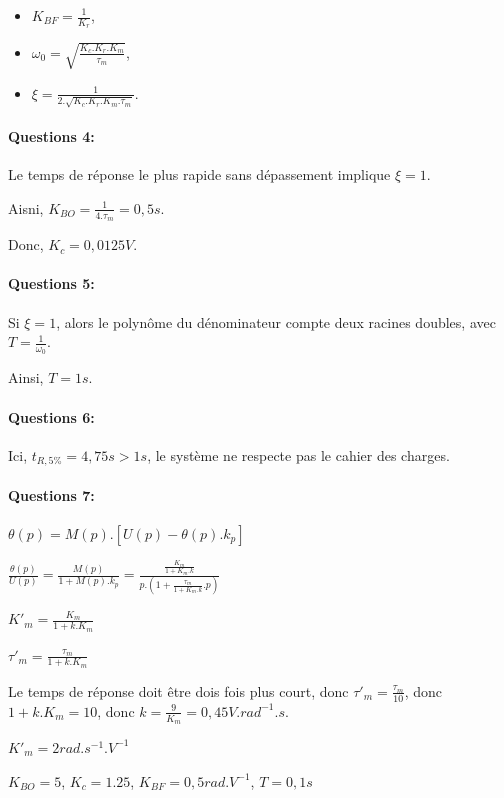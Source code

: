 \begin{itemize}
 \item $K_{BF}=\frac{1}{K_r}$,
 \item $\omega_0=\sqrt{\frac{K_c.K_r.K_m}{\tau_m}}$,
 \item $\xi=\frac{1}{2.\sqrt{K_c.K_r.K_m.\tau_m}}$.
\end{itemize}

\paragraph{Questions 4:}

Le temps de réponse le plus rapide sans dépassement implique $\xi=1$.

Aisni, $K_{BO}=\frac{1}{4.\tau_m}=0,5s$.

Donc, $K_c=0,0125V$.

\paragraph{Questions 5:}

Si $\xi=1$, alors le polynôme du dénominateur compte deux racines doubles, avec  $T=\frac{1}{\omega_0}$.

Ainsi, $T=1s$.

\paragraph{Questions 6:}

Ici, $t_{R,5\%}=4,75s>1s$, le système ne respecte pas le cahier des charges.

\paragraph{Questions 7:}

$\theta(p)=M(p).\left[U(p)-\theta(p).k_p\right]$

$\frac{\theta(p)}{U(p)}=\frac{M(p)}{1+M(p).k_p}=\frac{\frac{K_m}{1+K_m.k}}{p.(1+\frac{\tau_m}{1+K_m.k}.p)}$

$K'_m=\frac{K_m}{1+k.K_m}$

$\tau'_m=\frac{\tau_m}{1+k.K_m}$

Le temps de réponse doit être dois fois plus court, donc $\tau'_m=\frac{\tau_m}{10}$, donc $1+k.K_m=10$, donc $k=\frac{9}{K_m}=0,45V.rad^{-1}.s$.

$K'_m=2rad.s^{-1}.V^{-1}$

$K_{BO}=5$, $K_c=1.25$, $K_{BF}=0,5rad.V^{-1}$, $T=0,1s$

